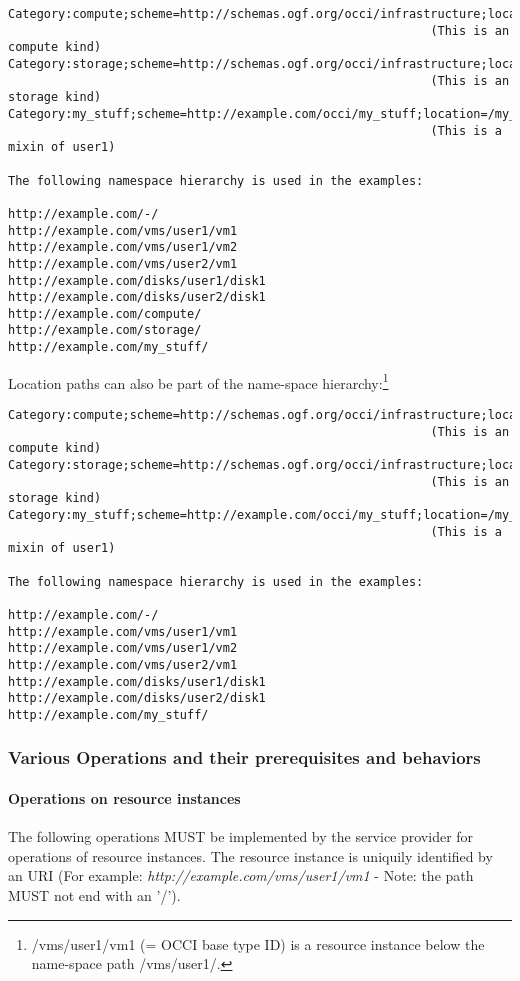\documentclass[10pt,a4paper]{article}
\begin{document}
\begin{verbatim}
Category:compute;scheme=http://schemas.ogf.org/occi/infrastructure;location=/compute 
                                                           (This is an compute kind)
Category:storage;scheme=http://schemas.ogf.org/occi/infrastructure;location=/storage 
                                                           (This is an storage kind)
Category:my_stuff;scheme=http://example.com/occi/my_stuff;location=/my_stuff 
                                                           (This is a mixin of user1)

The following namespace hierarchy is used in the examples:

http://example.com/-/
http://example.com/vms/user1/vm1
http://example.com/vms/user1/vm2
http://example.com/vms/user2/vm1
http://example.com/disks/user1/disk1
http://example.com/disks/user2/disk1
http://example.com/compute/
http://example.com/storage/
http://example.com/my_stuff/
\end{verbatim}

Location paths can also be part of the name-space
hierarchy:\footnote{/vms/user1/vm1 (= OCCI base type ID) is a resource
  instance below the name-space path /vms/user1/.}

\begin{verbatim}
Category:compute;scheme=http://schemas.ogf.org/occi/infrastructure;location=/vms 
                                                           (This is an compute kind)
Category:storage;scheme=http://schemas.ogf.org/occi/infrastructure;location=/disks 
                                                           (This is an storage kind)
Category:my_stuff;scheme=http://example.com/occi/my_stuff;location=/my_stuff 
                                                           (This is a mixin of user1)

The following namespace hierarchy is used in the examples:

http://example.com/-/
http://example.com/vms/user1/vm1
http://example.com/vms/user1/vm2
http://example.com/vms/user2/vm1
http://example.com/disks/user1/disk1
http://example.com/disks/user2/disk1
http://example.com/my_stuff/
\end{verbatim}

\subsubsection{Various Operations and their prerequisites and behaviors}

\paragraph{Operations on resource instances}
The following operations MUST be implemented by the service provider
for operations of resource instances. The resource instance is
uniquily identified by an URI (For example:
\emph{http://example.com/vms/user1/vm1} - Note: the path MUST not end
with an '/').
\end{document}
